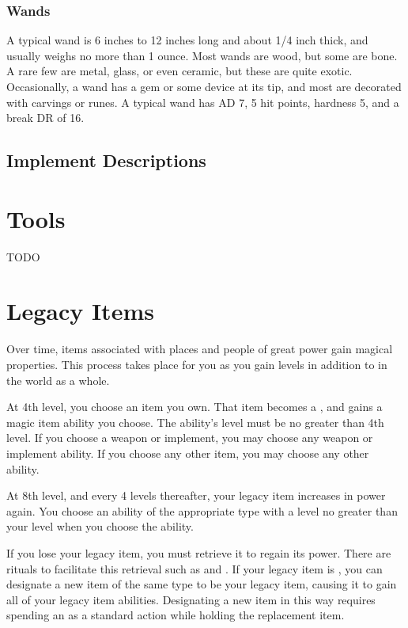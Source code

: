         \subsubsection{Wands}

             A typical wand is 6 inches to 12 inches long and about 1/4 inch thick, and usually weighs no more than 1 ounce.
            Most wands are wood, but some are bone.
            A rare few are metal, glass, or even ceramic, but these are quite exotic.
            Occasionally, a wand has a gem or some device at its tip, and most are decorated with carvings or runes.
            A typical wand has AD 7, 5 hit points, hardness 5, and a break DR of 16.

    \subsection{Implement Descriptions}

        

\section{Tools}

    TODO

\section{Legacy Items}\label{Legacy Items}

    Over time, items associated with places and people of great power gain magical properties.
    This process takes place for you as you gain levels in addition to in the world as a whole.

    At 4th level, you choose an item you own.
    That item becomes a , and gains a magic item ability you choose.
    The ability's level must be no greater than 4th level.
    If you choose a weapon or implement, you may choose any weapon or implement ability.
    If you choose any other item, you may choose any other ability.

    At 8th level, and every 4 levels thereafter, your legacy item increases in power again.
    You choose an ability of the appropriate type with a level no greater than your level when you choose the ability.

    If you lose your legacy item, you must retrieve it to regain its power.
    There are rituals to facilitate this retrieval such as  and .
    If your legacy item is , you can designate a new item of the same type to be your legacy item, causing it to gain all of your legacy item abilities.
    Designating a new item in this way requires spending an  as a standard action while holding the replacement item.


